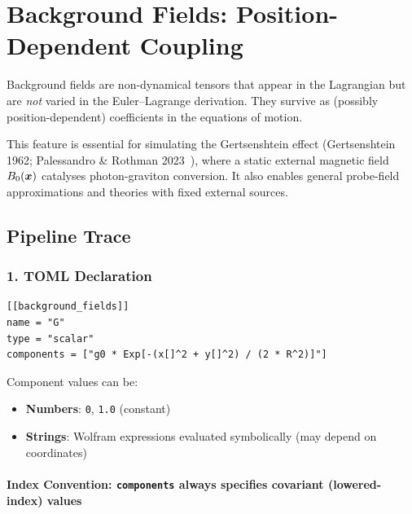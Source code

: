 
\section{Background Fields: Position-Dependent Coupling}
\label{sec:background-fields}

Background fields are non-dynamical tensors that appear in the Lagrangian
but are \emph{not} varied in the Euler--Lagrange derivation. They survive as
(possibly position-dependent) coefficients in the equations of motion.

This feature is essential for simulating the Gertsenshtein effect
(Gertsenshtein 1962; Palessandro \& Rothman 2023~\cite{palessandro2023simple}), where a static external
magnetic field $B_0(\bm{x})$ catalyses photon-graviton conversion. It also enables
general probe-field approximations and theories with fixed external sources.

\subsection{Pipeline Trace}
\label{sec:bg-pipeline-trace}

\subsubsection{1. TOML Declaration}
\label{sec:bg-toml}

\begin{lstlisting}[style=toml]
[[background_fields]]
name = "G"
type = "scalar"
components = ["g0 * Exp[-(x[]^2 + y[]^2) / (2 * R^2)]"]
\end{lstlisting}

Component values can be:

\begin{itemize}
  \item \textbf{Numbers}: \texttt{0}, \texttt{1.0} (constant)
  \item \textbf{Strings}: Wolfram expressions evaluated symbolically (may depend on coordinates)
\end{itemize}

\paragraph{Index Convention: \texttt{components} always specifies covariant (lowered-index) values}
\label{sec:bg-index-convention}

